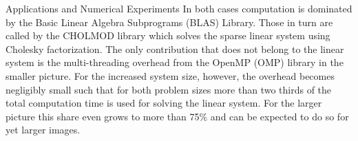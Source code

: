 \begin{chapter}{Applications and Numerical Experiments}
In both cases computation is dominated by the Basic Linear Algebra Subprograms (BLAS) Library. Those in turn are called by the CHOLMOD library which solves the sparse
linear system using Cholesky factorization. The only contribution that does not belong to the linear system is the multi-threading overhead from the OpenMP (OMP) library in the smaller picture.
For the increased system size, however, the overhead becomes negligibly small such that for both problem sizes more than two thirds of the total computation time is used for solving the linear
system. For the larger picture this share even grows to more than 75\% and can be expected to do so for yet larger images.\\
\begin{figure}[h!]
    \centering
\end{figure}
\begin{table}[h!]
\centering
\footnotesize
\setlength{\tabcolsep}{3pt}
\end{table}
\end{chapter}
